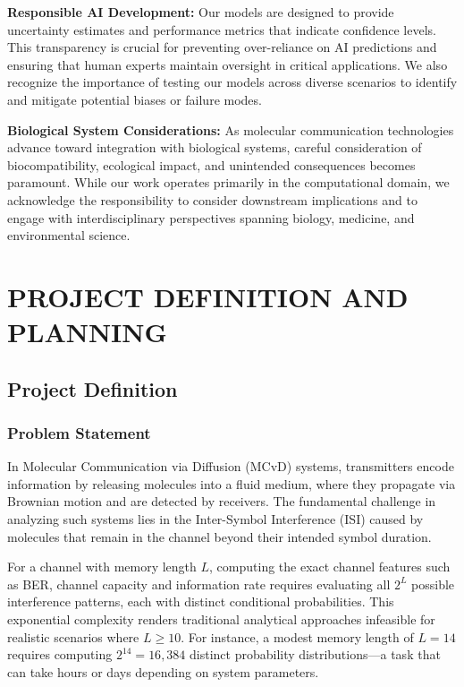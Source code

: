 \documentclass[a4paper,12pt]{report}
\begin{document}
\textbf{Responsible AI Development:} Our models are designed to provide uncertainty estimates and performance metrics that indicate confidence levels. This transparency is crucial for preventing over-reliance on AI predictions and ensuring that human experts maintain oversight in critical applications. We also recognize the importance of testing our models across diverse scenarios to identify and mitigate potential biases or failure modes.

\textbf{Biological System Considerations:} As molecular communication technologies advance toward integration with biological systems, careful consideration of biocompatibility, ecological impact, and unintended consequences becomes paramount. While our work operates primarily in the computational domain, we acknowledge the responsibility to consider downstream implications and to engage with interdisciplinary perspectives spanning biology, medicine, and environmental science.

\chapter{PROJECT DEFINITION AND PLANNING}

\section{Project Definition}

\subsection{Problem Statement}

In Molecular Communication via Diffusion (MCvD) systems, transmitters encode information by releasing molecules into a fluid medium, where they propagate via Brownian motion and are detected by receivers. The fundamental challenge in analyzing such systems lies in the Inter-Symbol Interference (ISI) caused by molecules that remain in the channel beyond their intended symbol duration.

For a channel with memory length $L$, computing the exact channel features such as BER, channel capacity and information rate requires evaluating all $2^L$ possible interference patterns, each with distinct conditional probabilities. This exponential complexity renders traditional analytical approaches infeasible for realistic scenarios where $L \geq 10$. For instance, a modest memory length of $L=14$ requires computing $2^{14} = 16,384$ distinct probability distributions—a task that can take hours or days depending on system parameters.
\end{document}
